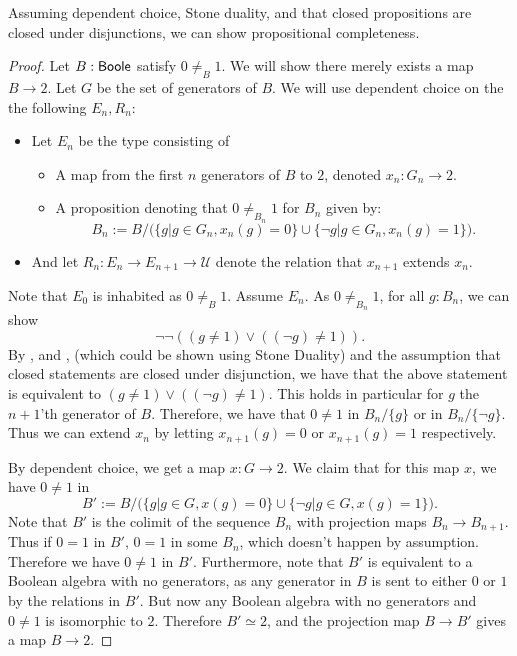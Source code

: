 \begin{lemma}\label{LLPOAndDCToCompleteness}
Assuming dependent choice, Stone duality, and that closed propositions are closed under disjunctions, 
we can show propositional completeness. 
\end{lemma}
\begin{proof}
  Let $B:\mathsf{Boole}$ satisfy $0\neq_B 1$. We will show there merely exists a map $B\to 2$. 
  Let $G$ be the set of generators of $B$. 
  We will use dependent choice on the the following $E_n,R_n$:
  \begin{itemize}
    \item 
  Let $E_n$ be the type consisting of 
  \begin{itemize}
    \item A map from the first $n$ generators of $B$ to $2$, denoted $x_n:G_n \to 2$. 
    \item A proposition denoting that $0\neq_{B_n} 1$ for $B_n$ given by:
      \begin{equation}
        B_n := B/\big( \{g|g\in G_n, x_n(g) = 0\} \cup \{ \neg g| g\in G_n, x_n(g) = 1\}\big).
      \end{equation}
  \end{itemize}
  \item 
    And let $R_n:E_n \to E_{n+1} \to \mathcal U$ denote the relation that $x_{n+1}$ extends $x_n$. 
  \end{itemize} 
  Note that $E_0$ is inhabited as $0\neq_B 1$. Assume $E_n$.
  As $0\neq_{B_n}1$, for all $g:B_n$, we can show 
  $$\neg \neg (( g\neq 1) \vee ((\neg g) \neq 1)).$$
  By , and , 
  (which could be shown using Stone Duality)
  and the assumption that 
  closed statements are closed under disjunction, we have that the above statement is equivalent to 
  $(g \neq 1) \vee ((\neg g) \neq 1)$. 
  This holds in particular for $g$ the $n+1$'th generator of $B$. 
  Therefore, we have that $0\neq 1$ in $B_n/\{g\}$ or in $B_n/\{\neg g\}$. 
  Thus we can extend $x_n$ by letting $x_{n+1}(g) = 0$ or $x_{n+1}(g) = 1$ respectively. 
  
  By dependent choice, we get a map $x:G\to 2$. 
  We claim that for this map $x$, we have $0\neq 1$ in 
  \begin{equation}
    B' := B/\big( \{g|g\in G, x(g) = 0\} \cup \{ \neg g| g\in G, x(g) = 1\}\big).
  \end{equation}
  Note that $B'$ is the colimit of the sequence $B_n$ with projection maps $B_n \to B_{n+1}$. 
  Thus if $0=1$ in $B'$, $0=1$ in some $B_n$, which doesn't happen by assumption. 
  Therefore we have $0\neq 1$ in $B'$. 
  Furthermore, note that $B'$ is equivalent to a Boolean algebra with no generators, 
  as any generator in $B$ is sent to either $0$ or $1$ by the relations in $B'$. 
%
  But now any Boolean algebra with no generators and $0\neq 1$ is isomorphic to $2$. 
  Therefore $B'\simeq 2$, and the projection map $B\to B'$ gives a map $B \to 2$. 
  

\end{proof}
